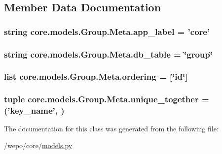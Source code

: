 \subsection{Member Data Documentation}
\hypertarget{classcore_1_1models_1_1Group_1_1Meta_a76147e00b0c352dd0b1d2322fdc53468}{
\subsubsection[{app\-\_\-label}]{\setlength{\rightskip}{0pt plus 5cm}string core.\-models.\-Group.\-Meta.\-app\-\_\-label = 'core'\hspace{0.3cm}{\ttfamily [static]}}}\label{classcore_1_1models_1_1Group_1_1Meta_a76147e00b0c352dd0b1d2322fdc53468}
\hypertarget{classcore_1_1models_1_1Group_1_1Meta_a6ff4edbed9d157ad060f934f2f135caf}{
\subsubsection[{db\-\_\-table}]{\setlength{\rightskip}{0pt plus 5cm}string core.\-models.\-Group.\-Meta.\-db\-\_\-table = \char`\"{}group\char`\"{}\hspace{0.3cm}{\ttfamily [static]}}}\label{classcore_1_1models_1_1Group_1_1Meta_a6ff4edbed9d157ad060f934f2f135caf}
\hypertarget{classcore_1_1models_1_1Group_1_1Meta_a0fa267be3302702571fa7b38d521d112}{
\subsubsection[{ordering}]{\setlength{\rightskip}{0pt plus 5cm}list core.\-models.\-Group.\-Meta.\-ordering = \mbox{[}\char`\"{}id\char`\"{}\mbox{]}\hspace{0.3cm}{\ttfamily [static]}}}\label{classcore_1_1models_1_1Group_1_1Meta_a0fa267be3302702571fa7b38d521d112}
\hypertarget{classcore_1_1models_1_1Group_1_1Meta_a915ea69536ed8dcaad1d1703e474dfac}{
\subsubsection[{unique\-\_\-together}]{\setlength{\rightskip}{0pt plus 5cm}tuple core.\-models.\-Group.\-Meta.\-unique\-\_\-together = ('{\bf key\-\_\-name}', )\hspace{0.3cm}{\ttfamily [static]}}}\label{classcore_1_1models_1_1Group_1_1Meta_a915ea69536ed8dcaad1d1703e474dfac}


The documentation for this class was generated from the following file\-:\begin{DoxyCompactItemize}
\item 
/wepo/core/\hyperlink{models_8py}{models.\-py}\end{DoxyCompactItemize}
